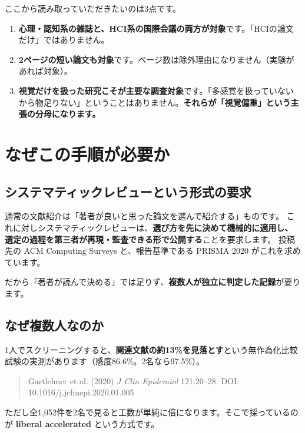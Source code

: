 \documentclass[a4paper]{ltjsarticle}
\begin{document}
\noindent
ここから読み取っていただきたいのは3点です。

\begin{enumerate}[leftmargin=1.8em]
  \item \textbf{心理・認知系の雑誌と、HCI系の国際会議の両方が対象}です。「HCIの論文だけ」ではありません。
  \item \textbf{2ページの短い論文も対象}です。ページ数は除外理由になりません（実験があれば対象）。
  \item \textbf{視覚だけを扱った研究こそが主要な調査対象}です。「多感覚を扱っていないから物足りない」ということはありません。\textbf{それらが「視覚偏重」という主張の分母になります。}
\end{enumerate}

\section{なぜこの手順が必要か}

\subsection*{システマティックレビューという形式の要求}

通常の文献紹介は「著者が良いと思った論文を選んで紹介する」ものです。
これに対しシステマティックレビューは、\textbf{選び方を先に決めて機械的に適用し、
選定の過程を第三者が再現・監査できる形で公開する}ことを要求します。
投稿先の ACM Computing Surveys と、報告基準である PRISMA 2020 がこれを求めています。

\medskip
\noindent
だから「著者が読んで決める」では足りず、\textbf{複数人が独立に判定した記録}が要ります。

\subsection*{なぜ複数人なのか}

1人でスクリーニングすると、\textbf{関連文献の約13\%を見落とす}という無作為化比較試験の実測があります（感度86.6\%。2名なら97.5\%）。

\begin{quote}\small
Gartlehner et al. (2020) \textit{J Clin Epidemiol} 121:20--28. DOI: 10.1016/j.jclinepi.2020.01.005
\end{quote}

\noindent
ただし全1,052件を2名で見ると工数が単純に倍になります。そこで採っているのが
\textbf{liberal accelerated} という方式です。
\end{document}
